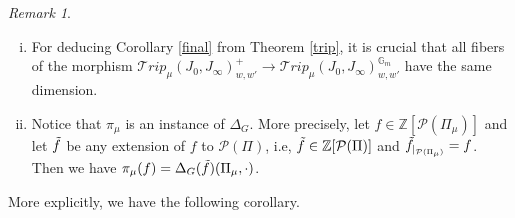 \documentclass{amsart}
\newcommand{\gm}{\mathbb{G}_{m}}
\theoremstyle{plain}
\theoremstyle{definition}
\theoremstyle{remark}
\newtheorem{remark}{Remark}[section]
\begin{document}
\begin{remark}\label{pi=delta}
\begin{enumerate}[(i)]
\item For deducing Corollary \ref{final} from Theorem \ref{trip}, it is crucial that all fibers of the morphism $\mathcal{T}rip_{\mu}(J_{0},J_{\infty})_{w,w'}^{+}\rightarrow\mathcal{T}rip_{\mu}(J_{0},J_{\infty})_{w,w'}^{\gm}$ have the same dimension.
   \item
   Notice that $\pi_{\mu}$ is an instance of $\Delta_{G}$. 
   More precisely, let $f\in\mathbb{Z}[\mathcal{P}(\Pi_{\mu})]$ and let $\Tilde{f}$ be any extension of $f$ to $\mathcal{P}(\Pi)$, i.e, $\Tilde{f}\in\mathbb{Z}[\mathcal{P}(\Pi)]$ and $\Tilde{f}_{|_{\mathcal{P}(\Pi_{\mu})}}=f$. Then we have $\pi_{\mu}(f)=\Delta_{G}(\Tilde{f})(\Pi_{\mu},\cdot)$.
\end{enumerate}
\end{remark}
More explicitly, we have the following corollary.
\end{document}
